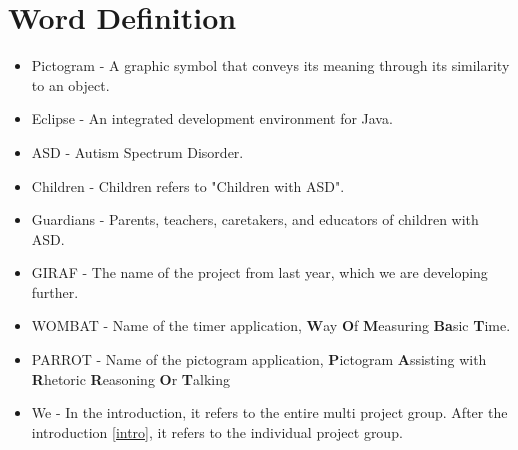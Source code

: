 \chapter*{Word Definition}

\begin{itemize}

	\item Pictogram - A graphic symbol that conveys its meaning through its similarity to an object.
	\item Eclipse - An integrated development environment for Java.
	\item ASD - Autism Spectrum Disorder.
	\item Children - Children refers to "Children with ASD".
	\item Guardians - Parents, teachers, caretakers, and educators of children with ASD.
	\item GIRAF - The name of the project from last year, which we are developing further.
	\item WOMBAT - Name of the timer application, \textbf{W}ay \textbf{O}f \textbf{M}easuring \textbf{Ba}sic \textbf{T}ime.
	\item PARROT - Name of the pictogram application, \textbf{P}ictogram \textbf{A}ssisting with \textbf{R}hetoric \textbf{R}easoning \textbf{O}r \textbf{T}alking
	\item We - In the introduction, it refers to the entire multi project group. After the introduction \autoref{intro}, it refers to the individual project group.

\end{itemize}